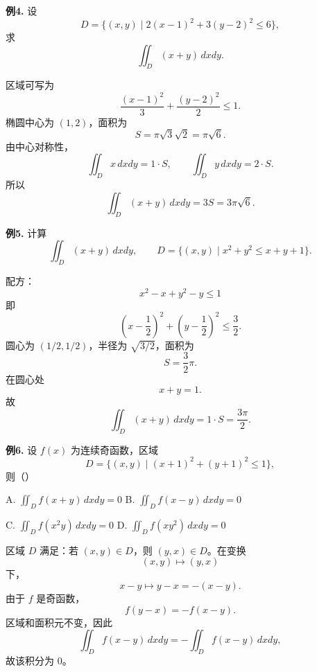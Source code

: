 \begin{problemblock}
\textbf{例4.} 设
\[
D=\{(x,y)\mid 2(x-1)^2+3(y-2)^2\le6\},
\]
求
\[
\iint_D(x+y)\,dxdy.
\]
\end{problemblock}
\begin{solutionblock}
区域可写为
\[
\frac{(x-1)^2}{3}+\frac{(y-2)^2}{2}\le1.
\]
椭圆中心为 \((1,2)\)，面积为
\[
S=\pi\sqrt3\sqrt2=\pi\sqrt6.
\]
由中心对称性，
\[
\iint_Dx\,dxdy=1\cdot S,\qquad
\iint_Dy\,dxdy=2\cdot S.
\]
所以
\[
\iint_D(x+y)\,dxdy=3S=3\pi\sqrt6.
\]
\end{solutionblock}

\begin{problemblock}
\textbf{例5.} 计算
\[
\iint_D(x+y)\,dxdy,
\qquad
D=\{(x,y)\mid x^2+y^2\le x+y+1\}.
\]
\end{problemblock}
\begin{solutionblock}
配方：
\[
x^2-x+y^2-y\le1
\]
即
\[
\left(x-\frac12\right)^2+\left(y-\frac12\right)^2\le\frac32.
\]
圆心为 \((1/2,1/2)\)，半径为 \(\sqrt{3/2}\)，面积为
\[
S=\frac32\pi.
\]
在圆心处
\[
x+y=1.
\]
故
\[
\iint_D(x+y)\,dxdy=1\cdot S=\frac{3\pi}{2}.
\]
\end{solutionblock}

\begin{problemblock}
\textbf{例6.} 设 \(f(x)\) 为连续奇函数，区域
\[
D=\{(x,y)\mid (x+1)^2+(y+1)^2\le1\},
\]
则（\quad）

A. \(\displaystyle \iint_D f(x+y)\,dxdy=0\)
\quad
B. \(\displaystyle \iint_D f(x-y)\,dxdy=0\)

C. \(\displaystyle \iint_D f(x^2y)\,dxdy=0\)
\quad
D. \(\displaystyle \iint_D f(xy^2)\,dxdy=0\)
\end{problemblock}
\begin{solutionblock}
区域 \(D\) 满足：若 \((x,y)\in D\)，则 \((y,x)\in D\)。在变换
\[
(x,y)\mapsto(y,x)
\]
下，
\[
x-y\mapsto y-x=-(x-y).
\]
由于 \(f\) 是奇函数，
\[
f(y-x)=-f(x-y).
\]
区域和面积元不变，因此
\[
\iint_D f(x-y)\,dxdy
=-\iint_D f(x-y)\,dxdy,
\]
故该积分为 \(0\)。
\end{solutionblock}

